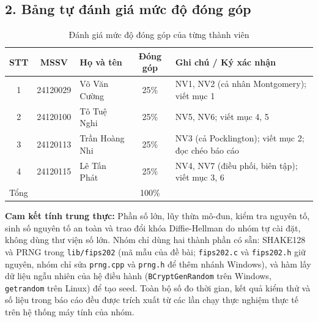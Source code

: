 \subsection*{2. Bảng tự đánh giá mức độ đóng góp}

\begin{table}[h!]
\centering
\small
\begin{tabular}{cclcp{5.5cm}}
\toprule
\textbf{STT} & \textbf{MSSV} & \textbf{Họ và tên} & \textbf{Đóng góp} & \textbf{Ghi chú / Ký xác nhận} \\
\midrule
1 & 24120029 & Võ Văn Cường & 25\% & NV1, NV2 (cả nhân Montgomery); viết mục 1 \\
2 & 24120100 & Tô Tuệ Nghi & 25\% & NV5, NV6; viết mục 4, 5 \\
3 & 24120113 & Trần Hoàng Nhi & 25\% & NV3 (cả Pocklington); viết mục 2; đọc chéo báo cáo \\
4 & 24120115 & Lê Tấn Phát & 25\% & NV4, NV7 (điều phối, biên tập); viết mục 3, 6 \\
\midrule
\multicolumn{3}{l}{Tổng} & 100\% & \\
\bottomrule
\end{tabular}

\caption{Đánh giá mức độ đóng góp của từng thành viên}
\label{tab:muc-dong-gop}
\end{table}

\noindent\textbf{Cam kết tính trung thực:} Phần số lớn, lũy thừa mô-đun, kiểm tra nguyên tố, sinh số nguyên tố an toàn và trao đổi khóa Diffie-Hellman do nhóm tự cài đặt, không dùng thư viện số lớn. Nhóm chỉ dùng hai thành phần có sẵn: SHAKE128 và PRNG trong \texttt{lib/fips202} (mã mẫu của đề bài; \texttt{fips202.c} và \texttt{fips202.h} giữ nguyên, nhóm chỉ sửa \texttt{prng.cpp} và \texttt{prng.h} để thêm nhánh Windows), và hàm lấy dữ liệu ngẫu nhiên của hệ điều hành (\texttt{BCryptGenRandom} trên Windows, \texttt{getrandom} trên Linux) để tạo seed.
Toàn bộ số đo thời gian, kết quả kiểm thử và số liệu trong báo cáo đều được trích xuất từ các lần chạy thực nghiệm thực tế trên hệ thống máy tính của nhóm.
